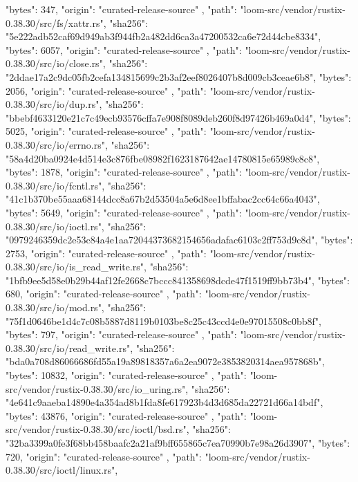 {{      "bytes": 347,
      "origin": "curated-release-source"
    },
    {
      "path": "loom-src/vendor/rustix-0.38.30/src/fs/xattr.rs",
      "sha256": "5e222adb52caf69d949ab3f944fb2a482dd6ca3a47200532ca6e72d44cbe8334",
      "bytes": 6057,
      "origin": "curated-release-source"
    },
    {
      "path": "loom-src/vendor/rustix-0.38.30/src/io/close.rs",
      "sha256": "2ddae17a2c9dc05fb2cefa134815699c2b3af2eef8026407b8d009cb3ceae6b8",
      "bytes": 2056,
      "origin": "curated-release-source"
    },
    {
      "path": "loom-src/vendor/rustix-0.38.30/src/io/dup.rs",
      "sha256": "bbebf4633120e21c7c49ecb93576cffa7e908f8089deb260f8d97426b469a0d4",
      "bytes": 5025,
      "origin": "curated-release-source"
    },
    {
      "path": "loom-src/vendor/rustix-0.38.30/src/io/errno.rs",
      "sha256": "58a4d20ba0924e4d514e3c876fbe08982f1623187642ae14780815e65989c8c8",
      "bytes": 1878,
      "origin": "curated-release-source"
    },
    {
      "path": "loom-src/vendor/rustix-0.38.30/src/io/fcntl.rs",
      "sha256": "41c1b370be55aaa68144dcc8a67b2d53504a5e6d8ee1bffabac2cc64c66a4043",
      "bytes": 5649,
      "origin": "curated-release-source"
    },
    {
      "path": "loom-src/vendor/rustix-0.38.30/src/io/ioctl.rs",
      "sha256": "0979246359dc2e53c84a4e1aa72044373682154656adafac6103c2ff753d9c8d",
      "bytes": 2753,
      "origin": "curated-release-source"
    },
    {
      "path": "loom-src/vendor/rustix-0.38.30/src/io/is_read_write.rs",
      "sha256": "1bfb9ee5d58e0b29b44af12fe2668c7bccc841358698dcde47f1519ff9bb73b4",
      "bytes": 680,
      "origin": "curated-release-source"
    },
    {
      "path": "loom-src/vendor/rustix-0.38.30/src/io/mod.rs",
      "sha256": "75f1d0646be1d4c7c08b5887d8119b0103be8c25c43ccd4e0e97015508c0bb8f",
      "bytes": 797,
      "origin": "curated-release-source"
    },
    {
      "path": "loom-src/vendor/rustix-0.38.30/src/io/read_write.rs",
      "sha256": "bda0a708d86066686fd55a19a89818357a6a2ea9072e3853820314aea957868b",
      "bytes": 10832,
      "origin": "curated-release-source"
    },
    {
      "path": "loom-src/vendor/rustix-0.38.30/src/io_uring.rs",
      "sha256": "4e641c9aaeba14890e4a354ad8b1fda8fe617923b4d3d685da22721d66a14bdf",
      "bytes": 43876,
      "origin": "curated-release-source"
    },
    {
      "path": "loom-src/vendor/rustix-0.38.30/src/ioctl/bsd.rs",
      "sha256": "32ba3399a0fe3f68bb458baafc2a21af9bff655865c7ea70990b7e98a26d3907",
      "bytes": 720,
      "origin": "curated-release-source"
    },
    {
      "path": "loom-src/vendor/rustix-0.38.30/src/ioctl/linux.rs",
}}
